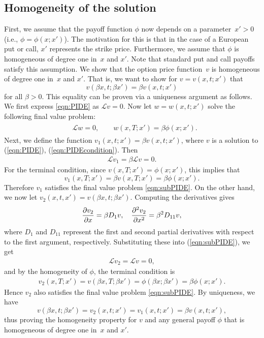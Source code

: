 \subsection{Homogeneity of the solution}
First, we assume that the payoff function $\phi$ now depends on a parameter~$x' > 0$ (i.e., $\phi = \phi(x;x')$).  The motivation for this is that in the case of a European put or call, $x'$ represents the strike price. Furthermore, we assume that $\phi$ is homogeneous of degree one in~$x$ and $x'$. Note that standard put and call payoffs satisfy this assumption. We show that the option price function~$v$ is homogeneous of degree one in~$x$ and $x'$. That is, we want to show for $v = v(x,t; x')$ that
		\begin{equation}
			\label{eqn:homogen}
			v(\beta x, t; \beta x') = \beta v(x,t; x')
		\end{equation}
for all $\beta > 0$. This equality can be proven via a uniqueness argument as follows. We first express \eqref{eqn:PIDE} as $\mathscr{L} v = 0$. Now let $w = w(x,t; x')$ solve the following final value problem:
		\begin{align}
			\label{eqn:subPIDE}
			\begin{split}
			&\mathscr{L}w = 0, \qquad w(x,T; x') = \beta\phi(x;x').
			\end{split}
		\end{align}
Next, we define the function $v_1(x,t;x') = \beta v(x,t;x')$, where $v$ is a solution to (\ref{eqn:PIDE}), (\ref{eqn:PIDEcondition}). Then
	\begin{align*}
		\mathscr{L}v_1 = \beta \mathscr{L}v = 0.
	\end{align*}
For the terminal condition, since $v(x,T;x') = \phi(x;x')$, this implies that
	\begin{equation*}
		v_1(x,T;x') = \beta v(x,T; x') = \beta\phi(x;x').
	\end{equation*}
Therefore $v_1$ satisfies the final value problem \eqref{eqn:subPIDE}. On the other hand, we now let $v_2(x,t,x') = v(\beta x, t; \beta x')$. Computing the derivatives gives
	\begin{equation*}
		\frac{\partial v_2}{\partial x} = \beta D_1v, \quad \frac{\partial^2 v_2}{\partial x^2} = \beta^2 D_{11}v,
	\end{equation*}
where $D_1$ and $D_{11}$ represent the first and second partial derivatives with respect to the first argument, respectively. Substituting these into (\ref{eqn:subPIDE}), we get
	\begin{align*}
		\mathscr{L}v_2 = \mathscr{L}v = 0,
	\end{align*}
and by the homogeneity of $\phi$, the terminal condition is
	\begin{align*}
		v_2(x,T;x') = v\left( \beta x, T; \beta x' \right) = \phi(\beta x; \beta x') = \beta \phi(x;x').
	\end{align*}
Hence $v_2$ also satisfies the final value problem \eqref{eqn:subPIDE}. By uniqueness, we have
	\begin{equation*}
		v\left(\beta x, t; \beta x'\right) = v_2(x,t;x') = v_1(x,t;x') = \beta v(x,t;x'),
	\end{equation*}
thus proving the homogeneity property for $v$ and any general payoff $\phi$ that is homogeneous of degree one in~$x$ and $x'$.

